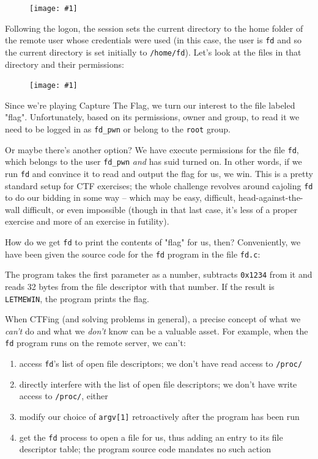 \documentclass{article}
\newcommand{\displayimage}[1] {
\begin{figure}[H]
    \centering
    \texttt{[image: \#1]} 
\end{figure}
}
\newcommand{\code}[1]{\colorbox{ubuntuback}{\texttt{#1}}}
\begin{document}
\displayimage{../00_fd/fd_welcome_message.png}

Following the logon, the session sets the current directory to the home folder of the remote user whose credentials were used (in this case, the user is \code{fd} and so the current directory is set initially to \code{/home/fd}). Let's look at the files in that directory and their permissions:

\displayimage{../00_fd/fd_permissions.png}

Since we're playing Capture The Flag, we turn our interest to the file labeled "flag". Unfortunately, based on its permissions, owner and group, to read it we need to be logged in as \code{fd\_pwn} or belong to the \code{root} group.

Or maybe there's another option? We have execute permissions for the file \code{fd}, which belongs to the user \code{fd\_pwn} \textit{and} has suid turned on. In other words, if we run \code{fd} and convince it to read and output the flag for us, we win. This is a pretty standard setup for CTF exercises; the whole challenge revolves around cajoling \code{fd} to do our bidding in some way -- which may be easy, difficult, head-against-the-wall difficult, or even impossible (though in that last case, it's less of a proper exercise and more of an exercise in futility).

How do we get \code{fd} to print the contents of "flag" for us, then? Conveniently, we have been given the source code for the \code{fd} program in the file \code{fd.c}:



The program takes the first parameter as a number, subtracts \code{0x1234} from it and reads 32 bytes from the file descriptor with that number. If the result is \code{LETMEWIN}, the program prints the flag.

When CTFing (and solving problems in general), a precise concept of what we \textit{can't} do and what we \textit{don't} know can be a valuable asset. For example, when the \code{fd} program runs on the remote server, we can't:

\begin{enumerate}
    \item access \code{fd}'s list of open file descriptors; we don't have read access to \code{/proc/}
    \item directly interfere with the list of open file descriptors; we don't have write access to \code{/proc/}, either
    \item modify our choice of \code{argv[1]} retroactively after the program has been run
    \item get the \code{fd} process to open a file for us, thus adding an entry to its file descriptor table; the program source code mandates no such action 
\end{enumerate}
\end{document}
